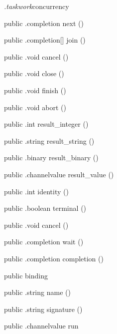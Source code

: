 \begin{CrexxClass}{\textit{.taskwork}}{concurrency}
\begin{Members}
    \Method
      {public}
      {.completion}
      {next}
      {()}

    \Method
      {public}
      {.completion[]}
      {join}
      {()}

    \Method
      {public}
      {.void}
      {cancel}
      {()}

    \Method
      {public}
      {.void}
      {close}
      {()}

    \Method
      {public}
      {.void}
      {finish}
      {()}

    \Method
      {public}
      {.void}
      {abort}
      {()}

    \Method
      {public}
      {.int}
      {result\_integer}
      {()}

    \Method
      {public}
      {.string}
      {result\_string}
      {()}

    \Method
      {public}
      {.binary}
      {result\_binary}
      {()}

    \Method
      {public}
      {.channelvalue}
      {result\_value}
      {()}

    \Method
      {public}
      {.int}
      {identity}
      {()}

    \Method
      {public}
      {.boolean}
      {terminal}
      {()}

    \Method
      {public}
      {.void}
      {cancel}
      {()}

    \Method
      {public}
      {.completion}
      {wait}
      {()}

    \Method
      {public}
      {.completion}
      {completion}
      {()}

    \Factory
      {public}
      {binding}
      {}

    \Method
      {public}
      {.string}
      {name}
      {()}

    \Method
      {public}
      {.string}
      {signature}
      {()}

    \Method
      {public}
      {.channelvalue}
      {run}
      {}

  \end{Members}
\end{CrexxClass}

